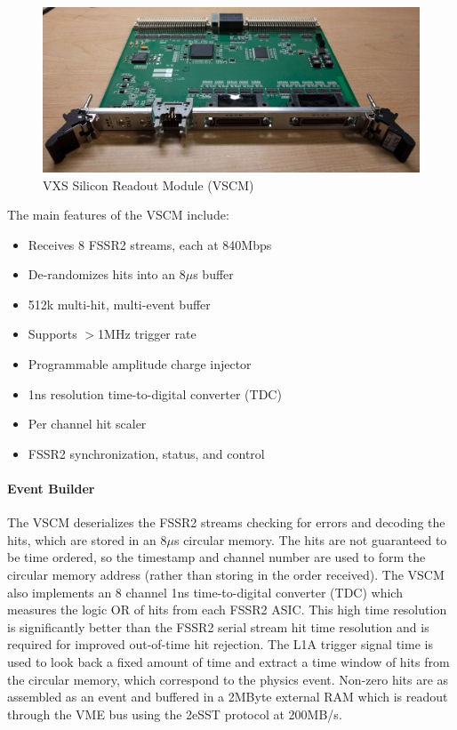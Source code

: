 \begin{figure}[hbt]
	\centering
	\includegraphics[width=1.0\columnwidth,keepaspectratio]{img/vscm_board.png}
	\caption{VXS Silicon Readout Module (VSCM)}
	\label{fig:vscm_board}
\end{figure}

The main features of the VSCM include:

\begin{itemize}
	\item Receives 8 FSSR2 streams, each at 840Mbps
	\item De-randomizes hits into an 8$\mu$s buffer
	\item 512k multi-hit, multi-event buffer
	\item Supports $>$1MHz trigger rate
	\item Programmable amplitude charge injector
	\item 1ns resolution time-to-digital converter (TDC)
	\item Per channel hit scaler
	\item FSSR2 synchronization, status, and control
\end{itemize}

\paragraph{Event Builder}
The VSCM deserializes the FSSR2 streams checking for errors and decoding the hits, which are stored in an 8$\mu$s circular memory. The hits are not guaranteed to be time ordered, so the timestamp and channel number are used to form the circular memory address (rather than storing in the order received). The VSCM also implements an 8 channel 1ns time-to-digital converter (TDC) which measures the logic OR of hits from each FSSR2 ASIC. This high time resolution is significantly better than the FSSR2 serial stream hit time resolution and is required for improved out-of-time hit rejection. The L1A trigger signal time is used to look back a fixed amount of time and extract a time window of hits from the circular memory, which correspond to the physics event. Non-zero hits are as assembled as an event and buffered in a 2MByte external RAM which is readout through the VME bus using the 2eSST protocol at 200MB/s.

